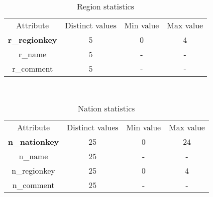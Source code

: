 \begin{table}[H]
\centering
\begin{tabular}{c|c|c|c} 
\rowcolor{blue!50} Attribute & Distinct values & Min value & Max value \\
\rowcolor{gray!10} \textbf{r\_regionkey} & 5 & 0 & 4 \\
\rowcolor{white} r\_name & 5 & - & - \\
\rowcolor{gray!10} r\_comment & 5 & - & - \\
\end{tabular}\\[0.5cm]
    \caption{Region statistics}
\end{table}

\begin{table}[H]
\centering
\begin{tabular}{c|c|c|c} 
\rowcolor{blue!50} Attribute & Distinct values & Min value & Max value \\
\rowcolor{gray!10} \textbf{n\_nationkey} & 25 & 0 & 24 \\
\rowcolor{white} n\_name & 25 & - & - \\
\rowcolor{gray!10} n\_regionkey & 25 & 0 & 4 \\
\rowcolor{white} n\_comment & 25 & - & - \\
\end{tabular}\\[0.5cm]
    \caption{Nation statistics}
\end{table}